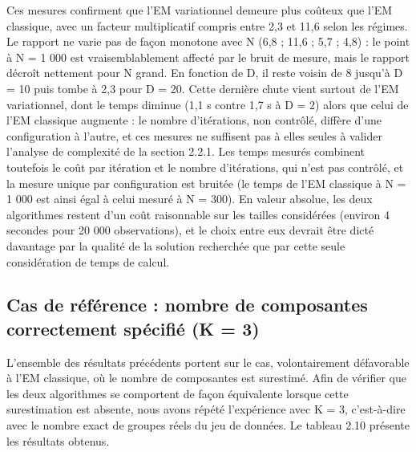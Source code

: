Ces mesures confirment que l'EM variationnel demeure plus coûteux que l'EM classique, avec un facteur multiplicatif compris entre 2,3 et 11,6 selon les régimes. Le rapport ne varie pas de façon monotone avec N (6,8 ; 11,6 ; 5,7 ; 4,8) : le point à N = 1 000 est vraisemblablement affecté par le bruit de mesure, mais le rapport décroît nettement pour N grand. En fonction de D, il reste voisin de 8 jusqu'à D = 10 puis tombe à 2,3 pour D = 20. Cette dernière chute vient surtout de l'EM variationnel, dont le temps diminue (1,1 s contre 1,7 s à D = 2) alors que celui de l'EM classique augmente : le nombre d'itérations, non contrôlé, diffère d'une configuration à l'autre, et ces mesures ne suffisent pas à elles seules à valider l'analyse de complexité de la section 2.2.1. Les temps mesurés combinent toutefois le coût par itération et le nombre d'itérations, qui n'est pas contrôlé, et la mesure unique par configuration est bruitée (le temps de l'EM classique à N = 1 000 est ainsi égal à celui mesuré à N = 300). En valeur absolue, les deux algorithmes restent d'un coût raisonnable sur les tailles considérées (environ 4 secondes pour 20 000 observations), et le choix entre eux devrait être dicté davantage par la qualité de la solution recherchée que par cette seule considération de temps de calcul.

\subsection{Cas de référence : nombre de composantes correctement spécifié (K = 3)}
L'ensemble des résultats précédents portent sur le cas, volontairement défavorable à l'EM classique, où le nombre de composantes est surestimé. Afin de vérifier que les deux algorithmes se comportent de façon équivalente lorsque cette surestimation est absente, nous avons répété l'expérience avec K = 3, c'est-à-dire avec le nombre exact de groupes réels du jeu de données. Le tableau 2.10 présente les résultats obtenus.

